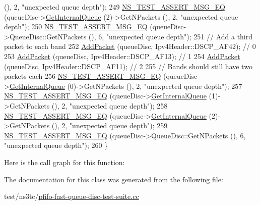 \begin{DoxyCode}
      (), 2, \textcolor{stringliteral}{"unexpected queue depth"});
249   \hyperlink{group__testing_ga2a9d78cffb3db8e867c35fff0b698cf5}{NS\_TEST\_ASSERT\_MSG\_EQ} (queueDisc->\hyperlink{classns3_1_1QueueDisc_adf09b498c07c5677c26ea4b8309def74}{GetInternalQueue} (2)->GetNPackets 
      (), 2, \textcolor{stringliteral}{"unexpected queue depth"});
250   \hyperlink{group__testing_ga2a9d78cffb3db8e867c35fff0b698cf5}{NS\_TEST\_ASSERT\_MSG\_EQ} (queueDisc->QueueDisc::GetNPackets (), 6, \textcolor{stringliteral}{"unexpected queue
       depth"});
251   \textcolor{comment}{// Add a third packet to each band}
252   \hyperlink{classPfifoFastQueueDiscOverflow_a582831d7aed3c5d5f57d3bd4859a7f89}{AddPacket} (queueDisc, Ipv4Header::DSCP\_AF42); \textcolor{comment}{// 0}
253   \hyperlink{classPfifoFastQueueDiscOverflow_a582831d7aed3c5d5f57d3bd4859a7f89}{AddPacket} (queueDisc, Ipv4Header::DSCP\_AF13); \textcolor{comment}{// 1}
254   \hyperlink{classPfifoFastQueueDiscOverflow_a582831d7aed3c5d5f57d3bd4859a7f89}{AddPacket} (queueDisc, Ipv4Header::DSCP\_AF11); \textcolor{comment}{// 2}
255   \textcolor{comment}{// Bands should still have two packets each}
256   \hyperlink{group__testing_ga2a9d78cffb3db8e867c35fff0b698cf5}{NS\_TEST\_ASSERT\_MSG\_EQ} (queueDisc->\hyperlink{classns3_1_1QueueDisc_adf09b498c07c5677c26ea4b8309def74}{GetInternalQueue} (0)->GetNPackets 
      (), 2, \textcolor{stringliteral}{"unexpected queue depth"});
257   \hyperlink{group__testing_ga2a9d78cffb3db8e867c35fff0b698cf5}{NS\_TEST\_ASSERT\_MSG\_EQ} (queueDisc->\hyperlink{classns3_1_1QueueDisc_adf09b498c07c5677c26ea4b8309def74}{GetInternalQueue} (1)->GetNPackets 
      (), 2, \textcolor{stringliteral}{"unexpected queue depth"});
258   \hyperlink{group__testing_ga2a9d78cffb3db8e867c35fff0b698cf5}{NS\_TEST\_ASSERT\_MSG\_EQ} (queueDisc->\hyperlink{classns3_1_1QueueDisc_adf09b498c07c5677c26ea4b8309def74}{GetInternalQueue} (2)->GetNPackets 
      (), 2, \textcolor{stringliteral}{"unexpected queue depth"});
259   \hyperlink{group__testing_ga2a9d78cffb3db8e867c35fff0b698cf5}{NS\_TEST\_ASSERT\_MSG\_EQ} (queueDisc->QueueDisc::GetNPackets (), 6, \textcolor{stringliteral}{"unexpected queue
       depth"});
260 \}
\end{DoxyCode}


Here is the call graph for this function\+:




The documentation for this class was generated from the following file\+:\begin{DoxyCompactItemize}
\item 
test/ns3tc/\hyperlink{pfifo-fast-queue-disc-test-suite_8cc}{pfifo-\/fast-\/queue-\/disc-\/test-\/suite.\+cc}\end{DoxyCompactItemize}
